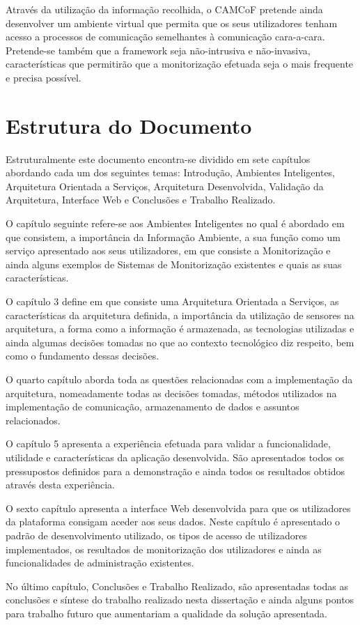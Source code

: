 Através da utilização da informação recolhida, o CAMCoF pretende ainda desenvolver um ambiente virtual que permita que os seus utilizadores tenham acesso a processos de comunicação semelhantes à comunicação cara-a-cara. Pretende-se também que a framework seja não-intrusiva e não-invasiva, características que permitirão que a monitorização efetuada seja o mais frequente e precisa possível.

\section{Estrutura do Documento}

Estruturalmente este documento encontra-se dividido em sete capítulos abordando cada um dos seguintes temas: Introdução, Ambientes Inteligentes, Arquitetura Orientada a Serviços, Arquitetura Desenvolvida, Validação da Arquitetura, Interface Web e Conclusões e Trabalho Realizado. 

O capítulo seguinte refere-se aos Ambientes Inteligentes no qual é abordado em que consistem, a importância da Informação Ambiente, a sua função como um serviço apresentado aos seus utilizadores, em que consiste a Monitorização e ainda alguns exemplos de Sistemas de Monitorização existentes e quais as suas características.

O capítulo 3 define em que consiste uma Arquitetura Orientada a Serviços, as características da arquitetura definida, a importância da utilização de sensores na arquitetura, a forma como a informação é armazenada, as tecnologias utilizadas e ainda algumas decisões tomadas no que ao contexto tecnológico diz respeito, bem como o fundamento dessas decisões.

O quarto capítulo aborda toda as questões relacionadas com a implementação da arquitetura, nomeadamente todas as decisões tomadas, métodos utilizados na implementação de comunicação, armazenamento de dados e assuntos relacionados.

O capítulo 5 apresenta a experiência efetuada para validar a funcionalidade, utilidade e características da aplicação desenvolvida. São apresentados todos os pressupostos definidos para a demonstração e ainda todos os resultados obtidos através desta experiência.

O sexto capítulo apresenta a interface Web desenvolvida para que os utilizadores da plataforma consigam aceder aos seus dados. Neste capítulo é apresentado o padrão de desenvolvimento utilizado, os tipos de acesso de utilizadores implementados, os resultados de monitorização dos utilizadores e ainda as funcionalidades de administração existentes.

No último capítulo, Conclusões e Trabalho Realizado, são apresentadas todas as conclusões e síntese do trabalho realizado nesta dissertação e ainda alguns pontos para trabalho futuro que aumentariam a qualidade da solução apresentada.

